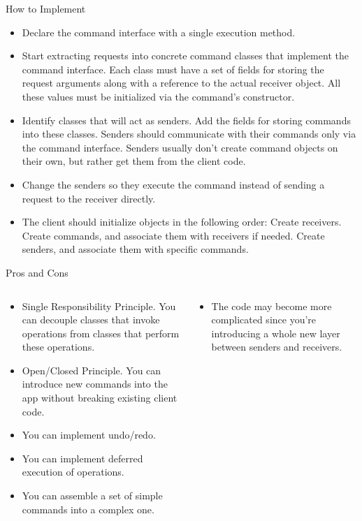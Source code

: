 \documentclass[13pt]{beamer}
\begin{document}
\begin{frame}{How to Implement}
	\begin{itemize}
		\item Declare the command interface with a single execution method.
		\item Start extracting requests into concrete command classes that implement the command interface. Each class must have a set of fields for storing the request arguments along with a reference to the actual receiver object. All these values must be initialized via the command’s constructor.
		\item Identify classes that will act as senders. Add the fields for storing commands into these classes. Senders should communicate with their commands only via the command interface. Senders usually don’t create command objects on their own, but rather get them from the client code.
		\item Change the senders so they execute the command instead of sending a request to the receiver directly.
		\item The client should initialize objects in the following order:
		    Create receivers.
		    Create commands, and associate them with receivers if needed.
		    Create senders, and associate them with specific commands.
	\end{itemize}
\end{frame}

\begin{frame}{Pros and Cons}
	\begin{columns}[T]
		\begin{column}{.5\textwidth}
			\begin{itemize}
				\item Single Responsibility Principle. You can decouple classes that invoke operations from classes that perform these operations.
				\item Open/Closed Principle. You can introduce new commands into the app without breaking existing client code.
				\item You can implement undo/redo.
				\item You can implement deferred execution of operations.
				\item You can assemble a set of simple commands into a complex one.
			\end{itemize}
		\end{column}
	
		\begin{column}{.5\textwidth}
			\begin{itemize}
				\item The code may become more complicated since you’re introducing a whole new layer between senders and receivers.
			\end{itemize}
		\end{column}
	\end{columns}
\end{frame}
\end{document}
